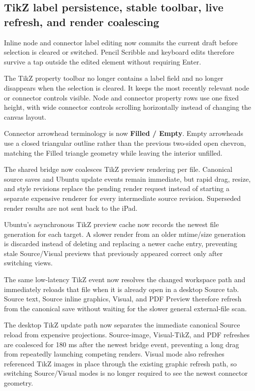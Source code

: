 \documentclass[a4paper]{article}
\title{}
\date{}
\author{Mohammad Rahmani}
\begin{document}
   \maketitle

   \begin{preview}
      \section*{TikZ label persistence, stable toolbar, live refresh, and render coalescing}

Inline node and connector label editing now commits the current draft before selection is cleared or switched. Pencil Scribble and keyboard edits therefore survive a tap outside the edited element without requiring Enter.

The TikZ property toolbar no longer contains a label field and no longer disappears when the selection is cleared. It keeps the most recently relevant node or connector controls visible. Node and connector property rows use one fixed height, with wide connector controls scrolling horizontally instead of changing the canvas layout.

Connector arrowhead terminology is now \textbf{Filled / Empty}. Empty arrowheads use a closed triangular outline rather than the previous two-sided open chevron, matching the Filled triangle geometry while leaving the interior unfilled.

The shared bridge now coalesces TikZ preview rendering per file. Canonical source saves and Ubuntu update events remain immediate, but rapid drag, resize, and style revisions replace the pending render request instead of starting a separate expensive renderer for every intermediate source revision. Superseded render results are not sent back to the iPad.

Ubuntu's asynchronous TikZ preview cache now records the newest file generation for each target. A slower render from an older mtime/size generation is discarded instead of deleting and replacing a newer cache entry, preventing stale Source/Visual previews that previously appeared correct only after switching views.

The same low-latency TikZ event now resolves the changed workspace path and immediately reloads that file when it is already open in a desktop Source tab. Source text, Source inline graphics, Visual, and PDF Preview therefore refresh from the canonical save without waiting for the slower general external-file scan.


The desktop TikZ update path now separates the immediate canonical Source reload from expensive projections. Source-image, Visual-TikZ, and PDF refreshes are coalesced for 180 ms after the newest bridge event, preventing a long drag from repeatedly launching competing renders. Visual mode also refreshes referenced TikZ images in place through the existing graphic refresh path, so switching Source/Visual modes is no longer required to see the newest connector geometry.

   \end{preview}

   
   
\end{document}
